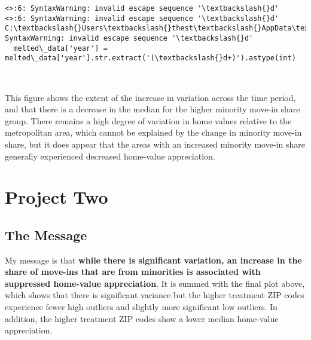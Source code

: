 \documentclass[11pt]{article}
\begin{document}
    \begin{Verbatim}[commandchars=\\\{\}]
<>:6: SyntaxWarning: invalid escape sequence '\textbackslash{}d'
<>:6: SyntaxWarning: invalid escape sequence '\textbackslash{}d'
C:\textbackslash{}Users\textbackslash{}thest\textbackslash{}AppData\textbackslash{}Local\textbackslash{}Temp\textbackslash{}ipykernel\_32012\textbackslash{}4157695199.py:6:
SyntaxWarning: invalid escape sequence '\textbackslash{}d'
  melted\_data['year'] = melted\_data['year'].str.extract('(\textbackslash{}d+)').astype(int)
    \end{Verbatim}

    \begin{center}
    \end{center}
    { \hspace*{\fill} \\}
    
    This figure shows the extent of the increase in variation across the
time period, and that there is a decrease in the median for the
higher minority move-in share group. There remains a high
degree of variation in home values relative to the metropolitan area,
which cannot be explained by the change in minority move-in share, but it does appear that the areas with an increased minority move-in share generally experienced decreased home-value appreciation. 

    \section{Project Two}\label{project-two}

    \subsection{The Message}\label{the-message}

    My message is that \textbf{while there is significant variation, an
increase in the share of move-ins that are from minorities is associated
with suppressed home-value appreciation}. It is summed with the final
plot above, which shows that there is significant variance but the
higher treatment ZIP codes experience fewer high outliers and slightly
more significant low outliers. In addition, the higher treatment ZIP
codes show a lower median home-value appreciation.
\end{document}
